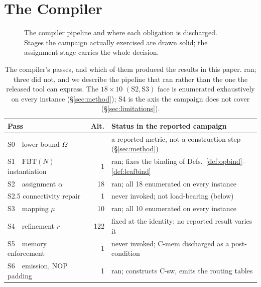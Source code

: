 \documentclass[journal,10pt]{IEEEtran}
\theoremstyle{plain}
\theoremstyle{definition}
\theoremstyle{remark}
\newcommand{\FBT}{\ensuremath{\mathrm{FBT}}}
\newcommand{\asgn}{\ensuremath{\alpha}}
\newcommand{\map}{\ensuremath{\mu}}
\begin{document}
\section{The Compiler}\label{sec:compiler}

\begin{figure}[!t]\centering

\caption{The compiler pipeline and where each obligation is discharged. Stages the campaign actually exercised are drawn solid; the assignment stage carries the whole decision.}\label{fig:compiler}
\end{figure}


\begin{table}[!t]
\caption{The compiler's passes, and which of them produced the results in this
  paper. \StagesRun{} ran; three did not, and we describe the pipeline that
  ran rather than the one the released tool can express. The $18\times10$
  $(\text{S2},\text{S3})$ face is enumerated exhaustively on every instance
  (\S\ref{sec:method}); S4 is the axis the campaign does not cover
  (\S\ref{sec:limitations}).}
\label{tab:stages}
\centering
\footnotesize
\renewcommand{\arraystretch}{1.15}
\begin{tabular}{@{}l@{\ \ }r@{\ \ }p{4.35cm}@{}}
\toprule
\textbf{Pass} & \textbf{Alt.} & \textbf{Status in the reported campaign} \\
\midrule
S0\ \ lower bound $\Omega$        & --  & a reported metric, not a construction step (\S\ref{sec:method}) \\
S1\ \ $\FBT(N)$ instantiation     & 1   & ran; fixes the binding of Defs.~\ref{def:opbind}--\ref{def:leafbind} \\
S2\ \ assignment $\asgn$          & 18  & ran; all 18 enumerated on every instance \\
S2.5 connectivity repair          & 1   & never invoked; not load-bearing (below) \\
S3\ \ mapping $\map$              & 10  & ran; all 10 enumerated on every instance \\
S4\ \ refinement $r$              & 122 & fixed at the identity; no reported result varies it \\
S5\ \ memory enforcement          & 1   & never invoked; \textsf{C-mem} discharged as a post-condition \\
S6\ \ emission, NOP padding       & 1   & ran; constructs \textsf{C-sw}, emits the routing tables \\
\bottomrule
\end{tabular}
\end{table}
\end{document}

